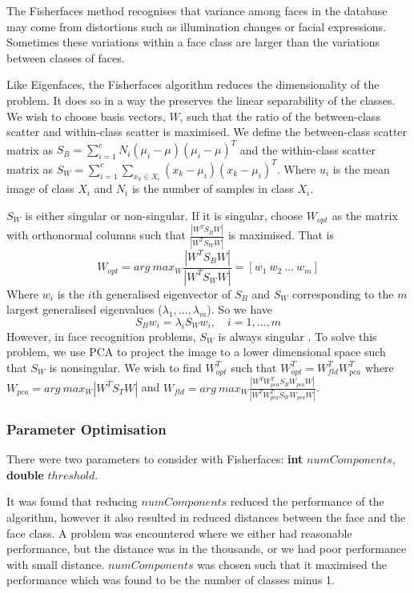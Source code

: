 \documentclass{article}
\begin{document}
The Fisherfaces method recognises that variance among faces in the database may come from distortions such as illumination changes or facial expressions. Sometimes these variations within a face class are larger than the variations between classes of faces.

Like Eigenfaces, the Fisherfaces algorithm reduces the dimensionality of the problem. It does so in a way the preserves the linear separability of the classes. We wish to choose basis vectors, $W$, such that the ratio of the between-class scatter and within-class scatter is maximised. We define the between-class scatter matrix as $S_B = \sum_{i=1}^{c}N_i(\mu_i - \mu)(\mu_i - \mu)^T$ and the within-class scatter matrix as  $S_W = \sum_{i=1}^{c}\sum_{x_k\in X_i}(x_k - \mu_i)(x_k - \mu_i)^T$. Where $u_i$ is the mean image of class $X_i$ and $N_i$ is the number of samples in class $X_i$.

$S_W$ is either singular or non-singular. If it is singular, choose $W_{opt}$ as the matrix with orthonormal columns such that $\frac{|W^TS_BW|}{|W^TS_WW|}$ is maximised. That is
\begin{equation}
	W_{opt} = arg\ max_W \frac{|W^TS_BW|}{|W^TS_WW|} = [w_1\ w_2\ \ldots\ w_m]
\end{equation}
Where $w_i$ is the $i$th generalised eigenvector of $S_B$ and $S_W$ corresponding to the $m$ largest generalised eigenvalues ($\lambda_1, \ldots, \lambda_m$). So we have
\begin{equation}
	S_Bw_i = \lambda_iS_Ww_i,\quad i=1, \ldots, m
\end{equation}
However, in face recognition problems, $S_W$ is always singular \cite{belhumeur1997eigenfaces}. To solve this problem, we use PCA to project the image to a lower dimensional space such that $S_W$ is nonsingular. We wish to find $W_{opt}^T$ such that $W_{opt}^T = W_{fld}^TW_{pca}^T$ where $W_{pca} = arg\ max_W|W^TS_TW|$ and $W_{fld} = arg\ max_W\frac{|W^TW_{pca}^TS_BW_{pca}W|}{|W^TW_{pca}^TS_WW_{pca}W|}$.
\subsubsection{Parameter Optimisation}
There were two parameters to consider with Fisherfaces: \textbf{int} $numComponents$, \textbf{double} $threshold$.

It was found that reducing $numComponents$ reduced the performance of the algorithm, however it also resulted in reduced distances between the face and the face class. A problem was encountered where we either had reasonable performance, but the distance was in the thousands, or we had poor performance with small distance. $numComponents$ was chosen such that it maximised the performance which was found to be the number of classes minus 1.
\end{document}
